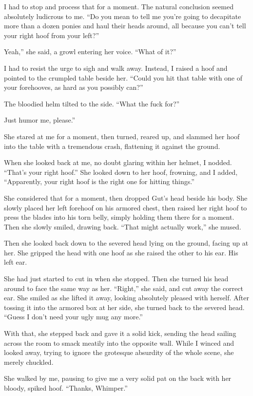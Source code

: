 I had to stop and process that for a moment. The natural conclusion seemed absolutely ludicrous to me. “Do you mean to tell me you’re going to decapitate more than a dozen ponies and haul their heads around, all because you can’t tell your right hoof from your left?”

\leavevmode{}Yeah,” she said, a growl entering her voice. “What of it?”

I had to resist the urge to sigh and walk away. Instead, I raised a hoof and pointed to the crumpled table beside her. “Could you hit that table with one of your forehooves, as hard as you possibly can?”

The bloodied helm tilted to the side. “What the fuck for?”

\leavevmode{}Just humor me, please.”

She stared at me for a moment, then turned, reared up, and slammed her hoof into the table with a tremendous crash, flattening it against the ground.

When she looked back at me, no doubt glaring within her helmet, I nodded. “That’s your right hoof.” She looked down to her hoof, frowning, and I added, “Apparently, your right hoof is the right one for hitting things.”

She considered that for a moment, then dropped Gut’s head beside his body. She slowly placed her left forehoof on his armored chest, then raised her right hoof to press the blades into his torn belly, simply holding them there for a moment. Then she slowly smiled, drawing back. “That might actually work,” she mused.

Then she looked back down to the severed head lying on the ground, facing up at her. She gripped the head with one hoof as she raised the other to his ear. His left ear.

She had just started to cut in when she stopped. Then she turned his head around to face the same way as her. “Right,” she said, and cut away the correct ear. She smiled as she lifted it away, looking absolutely pleased with herself. After tossing it into the armored box at her side, she turned back to the severed head. “Guess I don’t need your ugly mug any more.”

With that, she stepped back and gave it a solid kick, sending the head sailing across the room to smack meatily into the opposite wall. While I winced and looked away, trying to ignore the grotesque absurdity of the whole scene, she merely chuckled.

She walked by me, pausing to give me a very solid pat on the back with her bloody, spiked hoof. “Thanks, Whimper.”

